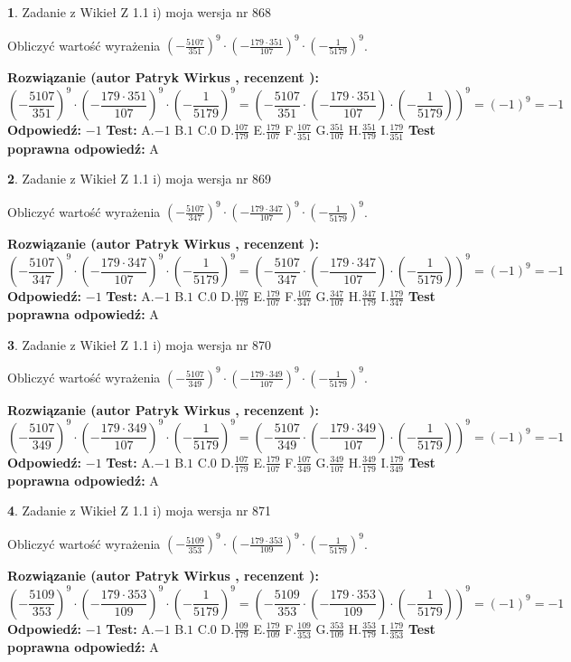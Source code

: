 \documentclass[12pt, a4paper]{article}
\theoremstyle{definition} %
\newtheorem{zad}{}
\newcommand{\zadStart}[1]{\begin{zad}#1\newline}
\newcommand{\zadStop}{\end{zad}}
\newcommand{\rozwStart}[2]{\noindent \textbf{Rozwiązanie (autor #1 , recenzent #2): }\newline}
\newcommand{\rozwStop}{\newline}
\newcommand{\odpStart}{\noindent \textbf{Odpowiedź:}\newline}
\newcommand{\odpStop}{\newline}
\newcommand{\testStart}{\noindent \textbf{Test:}\newline}
\newcommand{\testStop}{\newline}
\newcommand{\kluczStart}{\noindent \textbf{Test poprawna odpowiedź:}\newline}
\newcommand{\kluczStop}{\newline}
\begin{document}
\zadStart{Zadanie z Wikieł Z 1.1 i) moja wersja nr 868}

Obliczyć wartość wyrażenia $(-\frac{5107}{351})^{9} \cdot (-\frac{179 \cdot 351}{107})^{9} \cdot (-\frac{1}{5179})^{9}$.
\zadStop
\rozwStart{Patryk Wirkus}{}
$$(-\frac{5107}{351})^{9} \cdot (-\frac{179 \cdot 351}{107})^{9} \cdot (-\frac{1}{5179})^{9} = (-\frac{5107}{351} \cdot (-\frac{179 \cdot 351}{107}) \cdot (-\frac{1}{5179}))^{9} = (-1)^{9} = -1$$
\rozwStop
\odpStart
$-1$
\odpStop
\testStart
A.$-1$ B.$1$ C.$0$ D.$\frac{107}{179}$ E.$\frac{179}{107}$
F.$\frac{107}{351}$ G.$\frac{351}{107}$
H.$\frac{351}{179}$
I.$\frac{179}{351}$
\testStop
\kluczStart
A
\kluczStop



\zadStart{Zadanie z Wikieł Z 1.1 i) moja wersja nr 869}

Obliczyć wartość wyrażenia $(-\frac{5107}{347})^{9} \cdot (-\frac{179 \cdot 347}{107})^{9} \cdot (-\frac{1}{5179})^{9}$.
\zadStop
\rozwStart{Patryk Wirkus}{}
$$(-\frac{5107}{347})^{9} \cdot (-\frac{179 \cdot 347}{107})^{9} \cdot (-\frac{1}{5179})^{9} = (-\frac{5107}{347} \cdot (-\frac{179 \cdot 347}{107}) \cdot (-\frac{1}{5179}))^{9} = (-1)^{9} = -1$$
\rozwStop
\odpStart
$-1$
\odpStop
\testStart
A.$-1$ B.$1$ C.$0$ D.$\frac{107}{179}$ E.$\frac{179}{107}$
F.$\frac{107}{347}$ G.$\frac{347}{107}$
H.$\frac{347}{179}$
I.$\frac{179}{347}$
\testStop
\kluczStart
A
\kluczStop



\zadStart{Zadanie z Wikieł Z 1.1 i) moja wersja nr 870}

Obliczyć wartość wyrażenia $(-\frac{5107}{349})^{9} \cdot (-\frac{179 \cdot 349}{107})^{9} \cdot (-\frac{1}{5179})^{9}$.
\zadStop
\rozwStart{Patryk Wirkus}{}
$$(-\frac{5107}{349})^{9} \cdot (-\frac{179 \cdot 349}{107})^{9} \cdot (-\frac{1}{5179})^{9} = (-\frac{5107}{349} \cdot (-\frac{179 \cdot 349}{107}) \cdot (-\frac{1}{5179}))^{9} = (-1)^{9} = -1$$
\rozwStop
\odpStart
$-1$
\odpStop
\testStart
A.$-1$ B.$1$ C.$0$ D.$\frac{107}{179}$ E.$\frac{179}{107}$
F.$\frac{107}{349}$ G.$\frac{349}{107}$
H.$\frac{349}{179}$
I.$\frac{179}{349}$
\testStop
\kluczStart
A
\kluczStop



\zadStart{Zadanie z Wikieł Z 1.1 i) moja wersja nr 871}

Obliczyć wartość wyrażenia $(-\frac{5109}{353})^{9} \cdot (-\frac{179 \cdot 353}{109})^{9} \cdot (-\frac{1}{5179})^{9}$.
\zadStop
\rozwStart{Patryk Wirkus}{}
$$(-\frac{5109}{353})^{9} \cdot (-\frac{179 \cdot 353}{109})^{9} \cdot (-\frac{1}{5179})^{9} = (-\frac{5109}{353} \cdot (-\frac{179 \cdot 353}{109}) \cdot (-\frac{1}{5179}))^{9} = (-1)^{9} = -1$$
\rozwStop
\odpStart
$-1$
\odpStop
\testStart
A.$-1$ B.$1$ C.$0$ D.$\frac{109}{179}$ E.$\frac{179}{109}$
F.$\frac{109}{353}$ G.$\frac{353}{109}$
H.$\frac{353}{179}$
I.$\frac{179}{353}$
\testStop
\kluczStart
A
\kluczStop
\end{document}
